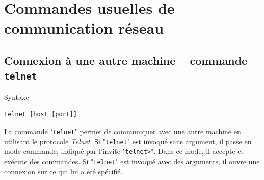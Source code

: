 %
%

\setcounter{remarque-cnt}{1}
\setcounter{example-cnt}{1}
\chapter{Commandes usuelles de communication r{\'e}seau}

\section{Connexion {\`a} une autre machine -- commande {\tt telnet}}

\begin{definition}{Syntaxe}
\begin{verbatim}
telnet [host [port]]
\end{verbatim}
\end{definition}

La commande "{\tt telnet}" permet de communiquer avec une autre machine en
utilisant le protocole {\sl Telnet}. Si "{\tt telnet}" est invoqu{\'e} sans
argument, il passe en mode commande, indiqu{\'e} par l'invite
"\verb=telnet>=". Dans ce mode, il accepte et ex{\'e}cute des commandes.
Si "{\tt telnet}" est invoqu{\'e} avec des arguments, il ouvre une connexion
sur ce qui lui a {\'e}t{\'e} sp{\'e}cifi{\'e}.

